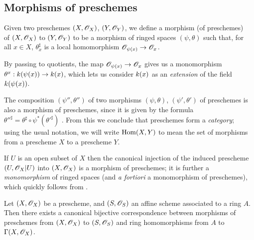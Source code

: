 \subsection{Morphisms of preschemes}
\label{subsection-prescheme-morphisms}

\begin{defn}[2.2.1]
\label{1.2.2.1}
Given two preschemes $(X,\mathscr{O}_X)$, $(Y,\mathscr{O}_Y)$, we
define a morphism (of preschemes) of $(X,\mathscr{O}_X)$ to $(Y,\mathscr{O}_Y)$ to be a morphism
of ringed spaces $(\psi,\theta)$ such that, for all $x\in X$, $\theta_x^\sharp$ is a
local homomorphism $\mathscr{O}_{\psi(x)}\to\mathscr{O}_x$.
\end{defn}

By passing to quotients, the map $\mathscr{O}_{\psi(x)}\to\mathscr{O}_x$ gives us a monomorphism
$\theta^x:k(\psi(x))\to k(x)$, which lets us consider $k(x)$ as an
{\em extension} of the field $k(\psi(x))$.

\begin{env}[2.2.2]
\label{1.2.2.2}
The composition $(\psi'',\theta'')$ of two morphisms
$(\psi,\theta)$, $(\psi',\theta')$ of preschemes is also a morphism of
preschemes, since it is given by the formula
${\theta''}^\sharp=\theta^\sharp\circ\psi^*({\theta'}^\sharp)$ . From this
we conclude that preschemes form a {\em category}; using the usual notation, we
will write ${\mathop{\mathrm{Hom}}\nolimits}(X,Y)$ to mean the set of morphisms from a prescheme $X$ to a
prescheme $Y$.
\end{env}

\begin{exm}[2.2.3]
\label{1.2.2.3}
If $U$ is an open subset of $X$ then the canonical
injection  of the induced prescheme $(U,\mathscr{O}_X|U)$ into
$(X,\mathscr{O}_X)$ is a morphism of preschemes; it is further a {\em monomorphism} of
ringed spaces (and {\em a fortiori} a monomorphism of preschemes), which
quickly follows from .
\end{exm}

\begin{prop}[2.2.4]
\label{1.2.2.4}
Let $(X,\mathscr{O}_X)$ be a prescheme, and $(S,\mathscr{O}_S)$ an
affine scheme associated to a ring $A$. Then there exists a canonical bijective
correspondence between morphisms of preschemes from $(X,\mathscr{O}_X)$ to $(S,\mathscr{O}_S)$ and
ring homomorphisms from $A$ to $\Gamma(X,\mathscr{O}_X)$.
\end{prop}

